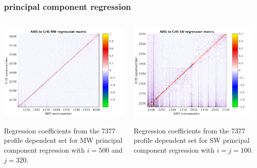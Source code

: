 \documentclass[10pt]{beamer}
\begin{document}
\begin{frame}
\frametitle{principal component regression}
\begin{columns}[t]
\begin{column}{0.5\textwidth}
  \begin{centering}
  \includegraphics[width=\textwidth]{figures/MW_pc_regr_mat.png}
  \end{centering}\vspace{3mm}
  Regression coefficients from the 7377 profile dependent set for
  MW principal component regression with $i = 500$ and $j = 320$.
 
\end{column}
\begin{column}{0.5\textwidth}  
  \begin{centering}
  \includegraphics[width=\textwidth]{figures/SW_pc_regr_mat.png}
  \end{centering}\vspace{3mm}
  Regression coefficients from the 7377 profile dependent set for
  SW principal component regression with $i = j = 100$.

\end{column}
\end{columns}
\end{frame}
\end{document}
